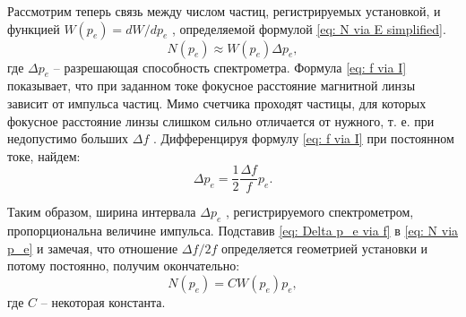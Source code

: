 \documentclass[a4paper,12pt]{article}
\begin{document}
Рассмотрим теперь связь между числом частиц, регистрируемых  установкой, и функцией $W(p_e) = dW/dp_e$ , определяемой формулой \eqref{eq: N via E simplified}.
\begin{equation}\label{eq: N via p_e}
    N(p_e) \approx W(p_e)\Delta p_e,
\end{equation}
где $\Delta p_e$ -- разрешающая способность спектрометра. Формула \eqref{eq: f via I} показывает, что при заданном токе фокусное расстояние магнитной линзы зависит от импульса частиц. Мимо счетчика проходят частицы, для которых фокусное расстояние линзы слишком сильно отличается от нужного, т. е. при недопустимо больших $\Delta f$ . Дифференцируя формулу \eqref{eq: f via I} при постоянном токе, найдем:
\begin{equation}\label{eq: Delta p_e via f}
    \Delta p_e = \frac{1}{2}\frac{\Delta f}{f}p_e.
\end{equation}

Таким образом, ширина интервала $\Delta p_e$ , регистрируемого спектрометром, пропорциональна величине импульса.
Подставив \eqref{eq: Delta p_e via f} в  \eqref{eq: N via p_e} и замечая, что отношение $\Delta f/2f$ определяется геометрией установки и потому постоянно, получим окончательно:
\begin{equation}\label{eq: N via p_e final}
    N(p_e) = CW(p_e)p_e,
\end{equation}
где $C$ -- некоторая константа.
\end{document}
